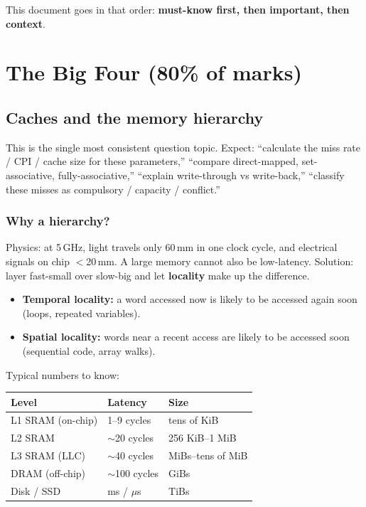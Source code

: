 \documentclass[11pt,a4paper]{article}
\begin{document}
This document goes in that order: \textbf{must-know first, then important, then context}.

\hrulefill

\section{The Big Four (80\% of marks)}

\subsection{Caches and the memory hierarchy}

\begin{must}
This is the single most consistent question topic. Expect: ``calculate the miss rate / CPI / cache size for these parameters,'' ``compare direct-mapped, set-associative, fully-associative,'' ``explain write-through vs write-back,'' ``classify these misses as compulsory / capacity / conflict.''
\end{must}

\subsubsection*{Why a hierarchy?}

Physics: at 5\,GHz, light travels only 60\,mm in one clock cycle, and electrical signals on chip $<$20\,mm. A large memory cannot also be low-latency. Solution: layer fast-small over slow-big and let \textbf{locality} make up the difference.

\begin{itemize}[leftmargin=*,itemsep=1pt]
  \item \textbf{Temporal locality:} a word accessed now is likely to be accessed again soon (loops, repeated variables).
  \item \textbf{Spatial locality:} words near a recent access are likely to be accessed soon (sequential code, array walks).
\end{itemize}

Typical numbers to know:

\begin{center}
\begin{tabular}{lll}
\hline
Level & Latency & Size \\
\hline
L1 SRAM (on-chip)   & 1--9 cycles      & tens of KiB \\
L2 SRAM             & $\sim$20 cycles  & 256 KiB--1 MiB \\
L3 SRAM (LLC)       & $\sim$40 cycles  & MiBs--tens of MiB \\
DRAM (off-chip)     & $\sim$100 cycles & GiBs \\
Disk / SSD          & ms / $\mu$s      & TiBs \\
\hline
\end{tabular}
\end{center}
\end{document}
